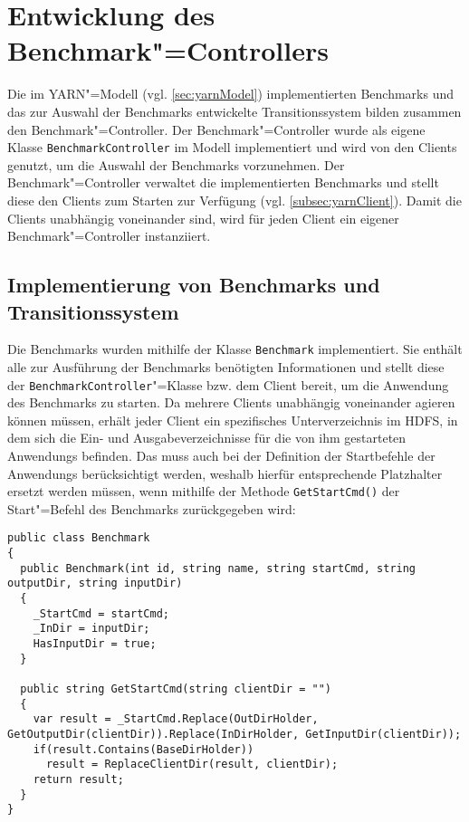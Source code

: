 \section{Entwicklung des Benchmark"=Controllers}
\label{sec:benchmarkController}

Die im \gls{YARN}"=Modell (vgl. \cref{sec:yarnModel}) implementierten Benchmarks und das zur Auswahl der Benchmarks entwickelte Transitionssystem bilden zusammen den Benchmark"=Controller.
Der Benchmark"=Controller wurde als eigene Klasse \texttt{BenchmarkController} im Modell implementiert und wird von den Clients genutzt, um die Auswahl der Benchmarks vorzunehmen.
Der Benchmark"=Controller verwaltet die implementierten Benchmarks und stellt diese den Clients zum Starten zur Verfügung (vgl. \cref{subsec:yarnClient}).
Damit die Clients unabhängig voneinander sind, wird für jeden Client ein eigener Benchmark"=Controller instanziiert.

\subsection{Implementierung von Benchmarks und Transitionssystem}
\label{subsec:appImplementation}

Die Benchmarks wurden mithilfe der Klasse \texttt{Benchmark} implementiert.
Sie enthält alle zur Ausführung der Benchmarks benötigten Informationen und stellt diese der \texttt{BenchmarkController}"=Klasse bzw. dem Client bereit, um die \gls{Anwendung} des Benchmarks zu starten.
Da mehrere Clients unabhängig voneinander agieren können müssen, erhält jeder Client ein spezifisches Unterverzeichnis im \gls{HDFS}, in dem sich die Ein- und Ausgabeverzeichnisse für die von ihm gestarteten \glspl{Anwendung} befinden.
Das muss auch bei der Definition der Startbefehle der \glspl{Anwendung} berücksichtigt werden, weshalb hierfür entsprechende Platzhalter ersetzt werden müssen, wenn mithilfe der Methode \texttt{GetStartCmd()} der Start"=Befehl des Benchmarks zurückgegeben wird:

\begin{lstlisting}[label=lst:benchmarkClass,style=cs,
caption={[Wesentliche Methoden der Klasse Benchmark]
    Wesentliche Methoden der Klasse \texttt{Benchmark}}]
public class Benchmark
{
  public Benchmark(int id, string name, string startCmd, string outputDir, string inputDir)
  {
    _StartCmd = startCmd;
    _InDir = inputDir;
    HasInputDir = true;
  }
  
  public string GetStartCmd(string clientDir = "")
  {
    var result = _StartCmd.Replace(OutDirHolder, GetOutputDir(clientDir)).Replace(InDirHolder, GetInputDir(clientDir));
    if(result.Contains(BaseDirHolder))
      result = ReplaceClientDir(result, clientDir);
    return result;
  }
}
\end{lstlisting}

